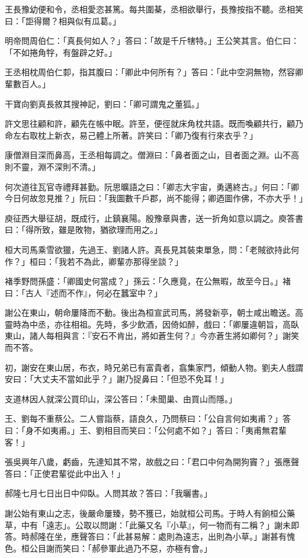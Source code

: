 王長豫幼便和令，丞相愛恣甚篤。每共圍棊，丞相欲舉行，長豫按指不聽。丞相笑曰：「詎得爾？相與似有瓜葛。」

明帝問周伯仁：「真長何如人？」答曰：「故是千斤犗特。」王公笑其言。伯仁曰：「不如捲角牸，有盤辟之好。」

王丞相枕周伯仁厀，指其腹曰：「卿此中何所有？」答曰：「此中空洞無物，然容卿輩數百人。」

干寶向劉真長敘其搜神記，劉曰：「卿可謂鬼之董狐。」

許文思往顧和許，顧先在帳中眠。許至，便徑就床角枕共語。既而喚顧共行，顧乃命左右取枕上新衣，易己體上所著。許笑曰：「卿乃復有行來衣乎？」

康僧淵目深而鼻高，王丞相每調之。僧淵曰：「鼻者面之山，目者面之淵。山不高則不靈，淵不深則不清。」

何次道往瓦官寺禮拜甚勤。阮思曠語之曰：「卿志大宇宙，勇邁終古。」何曰：「卿今日何故忽見推？」阮曰：「我圖數千戶郡，尚不能得；卿迺圖作佛，不亦大乎！」

庾征西大舉征胡，既成行，止鎮襄陽。殷豫章與書，送一折角如意以調之。庾答書曰：「得所致，雖是敗物，猶欲理而用之。」

桓大司馬乘雪欲獵，先過王、劉諸人許。真長見其裝束單急，問：「老賊欲持此何作？」桓曰：「我若不為此，卿輩亦那得坐談？」

褚季野問孫盛：「卿國史何當成？」孫云：「久應竟，在公無暇，故至今日。」褚曰：「古人『述而不作』，何必在蠶室中？」

謝公在東山，朝命屢降而不動。後出為桓宣武司馬，將發新亭，朝士咸出瞻送。高靈時為中丞，亦往相祖。先時，多少飲酒，因倚如醉，戲曰：「卿屢違朝旨，高臥東山，諸人每相與言：『安石不肯出，將如蒼生何？』今亦蒼生將如卿何？」謝笑而不答。

初，謝安在東山居，布衣，時兄弟已有富貴者，翕集家門，傾動人物。劉夫人戲謂安曰：「大丈夫不當如此乎？」謝乃捉鼻曰：「但恐不免耳！」

支道林因人就深公買印山，深公答曰：「未聞巢、由買山而隱。」

王、劉每不重蔡公。二人嘗詣蔡，語良久，乃問蔡曰：「公自言何如夷甫？」答曰：「身不如夷甫。」王、劉相目而笑曰：「公何處不如？」答曰：「夷甫無君輩客！」

張吳興年八歲，虧齒，先達知其不常，故戲之曰：「君口中何為開狗竇？」張應聲答曰：「正使君輩從此中出入！」

郝隆七月七日出日中仰臥。人問其故？答曰：「我曬書。」

謝公始有東山之志，後嚴命屢臻，勢不獲已，始就桓公司馬。于時人有餉桓公藥草，中有「遠志」。公取以問謝：「此藥又名『小草』，何一物而有二稱？」謝未即答。時郝隆在坐，應聲答曰：「此甚易解：處則為遠志，出則為小草。」謝甚有愧色。桓公目謝而笑曰：「郝參軍此過乃不惡，亦極有會。」

